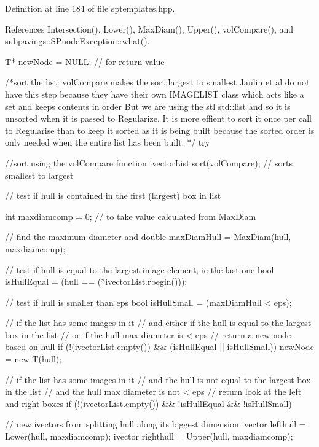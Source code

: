\-Definition at line 184 of file sptemplates.\-hpp.



\-References \-Intersection(), \-Lower(), \-Max\-Diam(), \-Upper(), vol\-Compare(), and subpavings\-::\-S\-Pnode\-Exception\-::what().


\begin{DoxyCode}
{
    T* newNode = NULL;  // for return value

    /*sort the list: volCompare makes the sort largest to smallest
    Jaulin et al do not have this step because they have their own
    IMAGELIST class which acts like a set and keeps contents in order
    But we are using the stl std::list and so it is unsorted when
    it is passed to Regularize.  It is more effient to sort it once
    per call to Regularise than to keep it sorted as it is
    being built because the sorted order is only needed when
    the entire list has been built.
    */
    try {

        //sort using the volCompare function
        ivectorList.sort(volCompare);   // sorts smallest to largest

        // test if hull is contained in the first (largest) box in list

        int maxdiamcomp = 0;  // to take value calculated from MaxDiam

        // find the maximum diameter and
        double maxDiamHull = MaxDiam(hull, maxdiamcomp);

        // test if hull is equal to the largest image element, ie the last one
        bool isHullEqual = (hull == (*ivectorList.rbegin()));

        // test if hull is smaller than eps
        bool isHullSmall = (maxDiamHull < eps);

        // if the list has some images in it
        // and either if the hull is equal to the largest box in the list
        // or if the hull max diameter is < eps
        // return a new node based on hull
        if (!(ivectorList.empty()) && (isHullEqual || isHullSmall)) {
                newNode = new T(hull);
        }

        // if the list has some images in it
        // and the hull is not equal to the largest box in the list
        // and the hull max diameter is not < eps
        // return look at the left and right boxes
        if (!(ivectorList.empty()) && !isHullEqual && !isHullSmall) {

            // new ivectors from splitting hull along its biggest dimension
            ivector lefthull = Lower(hull, maxdiamcomp);
            ivector righthull = Upper(hull, maxdiamcomp);

}}}
\end{DoxyCode}
